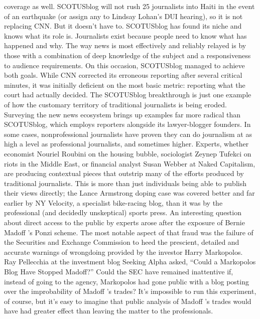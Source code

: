 coverage as well. SCOTUSblog will not rush 25 journalists into Haiti in the
event of an earthquake (or assign any to Lindsay Lohan’s DUI hearing), so it is
not replacing CNN. But it doesn’t have to. SCOTUSblog has found its niche and
knows what its role is.
Journalists exist because people need to know what has happened and why. The
way news is most effectively and reliably relayed is by those with a combination
of deep knowledge of the subject and a responsiveness to audience requirements.
On this occasion, SCOTUSblog managed to achieve both goals. While CNN
corrected its erroneous reporting after several critical minutes, it was initially
deficient on the most basic metric: reporting what the court had actually decided.
The SCOTUSblog breakthrough is just one example of how the customary
territory of traditional journalists is being eroded. Surveying the new news ecosystem
brings up examples far more radical than SCOTUSblog, which employs
reporters alongside its lawyer-blogger founders. In some cases, nonprofessional
journalists have proven they can do journalism at as high a level as professional
journalists, and sometimes higher. Experts, whether economist Nouriel Roubini
on the housing bubble, sociologist Zeynep Tufekci on riots in the Middle East,
or financial analyst Susan Webber at Naked Capitalism, are producing contextual
pieces that outstrip many of the efforts produced by traditional journalists. This
is more than just individuals being able to publish their views directly; the Lance
Armstrong doping case was covered better and far earlier by NY Velocity, a specialist
bike-racing blog, than it was by the professional (and decidedly unskeptical)
sports press.
An interesting question about direct access to the public by experts arose after the
exposure of Bernie Madoff ’s Ponzi scheme. The most notable aspect of that fraud
was the failure of the Securities and Exchange Commission to heed the prescient,
detailed and accurate warnings of wrongdoing provided by the investor Harry
Markopolos. Ray Pellecchia at the investment blog Seeking Alpha asked, ``Could
a Markopolos Blog Have Stopped Madoff?'' Could the SEC have remained inattentive
if, instead of going to the agency, Markopolos had gone public with a
blog posting over the improbability of Madoff ’s trades? It’s impossible to run this
experiment, of course, but it’s easy to imagine that public analysis of Madoff ’s
trades would have had greater effect than leaving the matter to the professionals.

